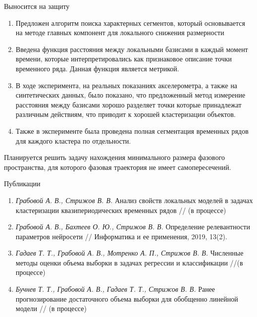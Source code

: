 \documentclass[10pt,pdf,hyperref={unicode}]{beamer}
\begin{document}
\begin{frame}[shrink=5]{Выносится на защиту}
	\begin{enumerate}
		\item Предложен алгоритм поиска характерных сегментов, который основывается на методе главных компонент для локального снижения размерности
		\item Введена функция расстояния между локальными базисами в каждый момент времени, которые интерпретировались как признаковое описание точки временного ряда. Данная функция является метрикой.
		\item В ходе эксперимента, на реальных показаниях акселерометра, а также на синтетических данных, было показано, что предложенный метод измерение расстояния между базисами хорошо разделяет точки которые принадлежат различным действиям, что приводит к хорошей кластеризации объектов.
		\item Также в эксперименте была проведена полная сегментация временных рядов для каждого кластера по отдельности.
	\end{enumerate}
	
	Планируется решить задачу нахождения минимального размера фазового пространства, для которого  фазовая траектория не имеет самопересечений.
\end{frame}
\begin{frame}{Публикации}
	\begin{enumerate}
		\item \textit{Грабовой А. В., Стрижов В. В.} Анализ свойств локальных моделей в задачах кластеризации квазипериодических временных рядов // (в процессе)
		\item \textit{Грабовой А. В., Бахтеев О. Ю., Стрижов В. В.} Определение релевантности параметров нейросети // Информатика и ее применения, 2019, 13(2).
		\item \textit{Гадаев Т. Т., Грабовой А. В., Мотренко А. П., Стрижов В. В.} Численные методы оценки объема выборки в задачах регрессии и классификации //(в процессе)
		\item \textit{Бучнев Т. Т., Грабовой А. В., Гадаев Т. Т., Стрижов В. В.} Ранее прогнозирование достаточного объема выборки для обобщенно линейной модели // (в процессе)
	\end{enumerate}
\end{frame}
\end{document}
